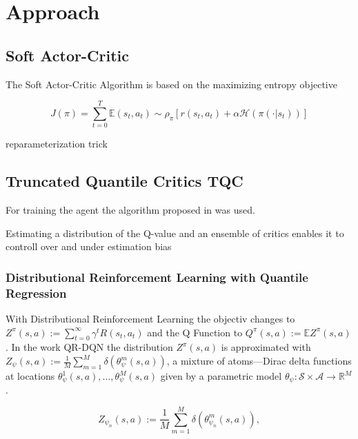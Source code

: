 \chapter{Approach}\label{chap:approach}


\section{Soft Actor-Critic}

The Soft Actor-Critic Algorithm \cite{haarnoja2018soft} is based on the maximizing entropy objective

\begin{equation}
\label{eq:maxent_objective}
  J(\pi)  = \sum_{t=0}^{T} \mathbb{E}(s_{t}, a_{t}) \sim \rho_{\pi}[r(s_{t},a_{t}) + \alpha \mathcal{H}(\pi(\cdot|s_{t}))]
\end{equation}





reparameterization trick


\section{Truncated Quantile Critics TQC}

For training the agent the algorithm proposed in \cite{} was used.

Estimating a distribution of the Q-value and an ensemble of critics
enables it to controll  over and under estimation bias  


\subsection{Distributional Reinforcement Learning with
Quantile Regression}

With Distributional Reinforcement Learning the objectiv changes to
$ Z^{\pi}(s, a) := \sum_{t=0}^{\infty} \gamma^{t} R\left(s_{t}, a_{t}\right)$
and the Q Function to $Q^{\pi}(s, a):=  \mathbb{E} {Z^{\pi}(s, a)}$.
In the work QR-DQN %
the distribution $Z^\pi(s,a)$ is approximated with
$ Z_{\psi}(s, a):=\frac{1}{M} \sum_{m=1}^{M} \delta ( \theta^{m}_\psi(s, a) )$,
a mixture of atoms---Dirac delta functions at locations $\theta^1_\psi(s,a), \dots ,\theta^M_\psi(s,a)$ 
given by a parametric model  $\theta_{\psi}: \mathcal{S} \times \mathcal{A} \rightarrow \mathbb{R}^M$.





\begin{equation}
  Z_{\psi_n}(s, a) := \frac{1}{M} \sum_{m=1}^{M} \delta \left(\theta_{\psi_n}^m(s, a) \right) ,
\end{equation}

